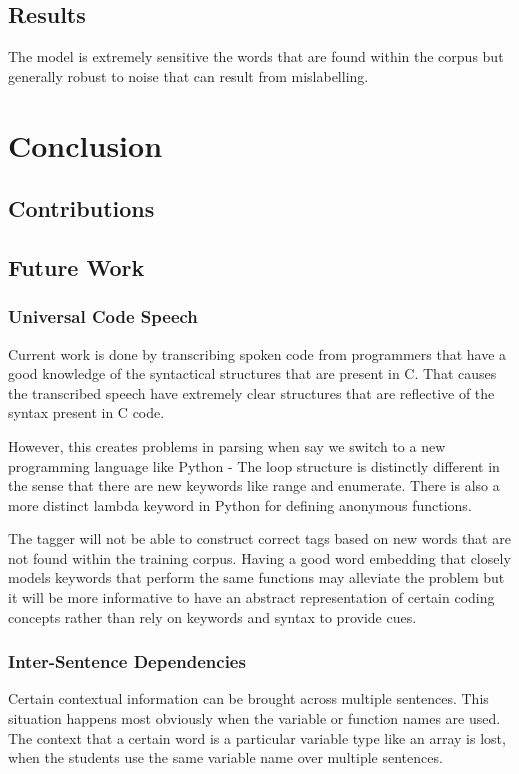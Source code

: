 \documentclass[fyp]{socreport}
\begin{document}
\section{Results}

The model is extremely sensitive the words that are found within the corpus but generally
robust to noise that can result from mislabelling.



\chapter{Conclusion}

\section{Contributions}

\section{Future Work}


\subsection{Universal Code Speech}
Current work is done by transcribing spoken code from programmers that have a
good knowledge of the syntactical structures that are present in C. That causes
the transcribed speech have extremely clear structures that are reflective of
the syntax present in C code.

However, this creates problems in parsing when say we switch to a new
programming language like Python - The loop structure is distinctly different
in the sense that there are new keywords like range and enumerate. There is
also a more distinct lambda keyword in Python for defining anonymous functions.

The tagger will not be able to construct correct tags based on new words that
are not found within the training corpus. Having a good word embedding that
closely models keywords that perform the same functions may alleviate the problem
but it will be more informative to have an abstract representation of certain
coding concepts rather than rely on keywords and syntax to provide cues.


\subsection{Inter-Sentence Dependencies}
Certain contextual information can be brought across multiple sentences. This
situation happens most obviously when the variable or function names are used.
The context that a certain word is a particular variable type like an array is
lost, when the students use the same variable name over multiple sentences.
\end{document}
